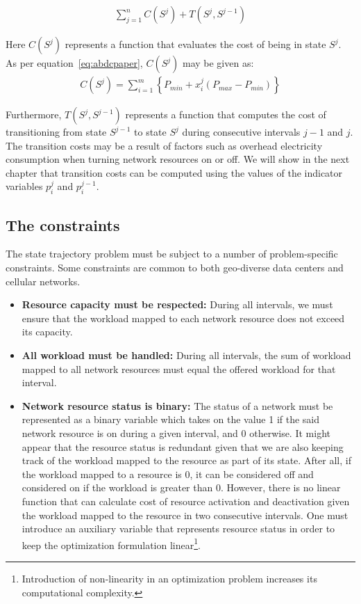 \begin{align}
\sum_{j=1}^n C(S^j) + T(S^j, S^{j-1})
\end{align}

Here $C(S^j)$ represents a function that evaluates the cost of being in state $S^j$. As per equation~\ref{eq:abdcpaper}, $C(S^j)$ may be given as:
\begin{align}
C(S^j) = \sum_{i=1}^m \left\{ P_{min} + x_i^j (P_{max} - P_{min}) \right\}
\end{align}

Furthermore, $T(S^j,S^{j-1})$ represents a function that computes the cost of transitioning from state $S^{j-1}$ to state $S^j$ during consecutive intervals $j-1$ and $j$. The transition costs may be a result of factors such as overhead electricity consumption when turning network resources on or off. We will show in the next chapter that transition costs can be computed using the values of the indicator variables $p_i^j$ and $p_i^{j-1}$.

\subsection{The constraints}
\label{subsec:framework:constraints} %
The state trajectory problem must be subject to a number of problem-specific constraints. Some constraints are common to both geo-diverse data centers and cellular networks. 

\begin{itemize}
\item \textbf{Resource capacity must be respected:} During all intervals, we must ensure that the workload mapped to each network resource does not exceed its capacity.
\item \textbf{All workload must be handled:} During all intervals, the sum of workload mapped to all network resources must equal the offered workload for that interval.
\item \textbf{Network resource status is binary:} The status of a network must be represented as a binary variable which takes on the value 1 if the said network resource is on during a given interval, and 0 otherwise. It might appear that the resource status is redundant given that we are also keeping track of the workload mapped to the resource as part of its state. After all, if the workload mapped to a resource is $0$, it can be considered off and considered on if the workload is greater than $0$. However, there is no linear function that can calculate cost of resource activation and deactivation given the workload mapped to the resource in two consecutive intervals. One must introduce an auxiliary variable that represents resource status in order to keep the optimization formulation linear\footnote{Introduction of non-linearity in an optimization problem increases its computational complexity.}. 
\end{itemize}

